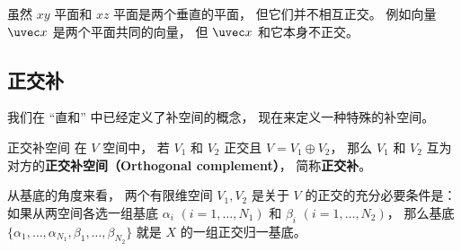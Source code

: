 \begin{example}{}
虽然 $xy$ 平面和 $xz$ 平面是两个垂直的平面， 但它们并不相互正交。 例如向量 $\uvec x$ 是两个平面共同的向量， 但 $\uvec x$ 和它本身不正交。
\end{example}

\subsection{正交补}
我们在 “直和” 中已经定义了补空间的概念， 现在来定义一种特殊的补空间。
\begin{definition}{正交补空间}\label{def_OrthSp_1}
在 $V$ 空间中， 若 $V_1$ 和 $V_2$ 正交且 $V = V_1 \oplus V_2$， 那么 $V_1$ 和 $V_2$ 互为对方的\textbf{正交补空间（Orthogonal complement）}， 简称\textbf{正交补}。
\end{definition}

\begin{theorem}{}\label{the_OrthSp_1}
从基底的角度来看， 两个有限维空间 $V_1, V_2$ 是关于 $V$ 的正交的充分必要条件是： 如果从两空间各选一组基底 ${\alpha_i}$ $(i = 1, \dots, N_1)$ 和 ${\beta_i}$ $(i = 1, \dots, N_2)$， 那么基底 $\{\alpha_1, \dots, \alpha_{N_1}, \beta_1, \dots, \beta_{N_2}\}$ 就是 $X$ 的一组正交归一基底。
\end{theorem}

